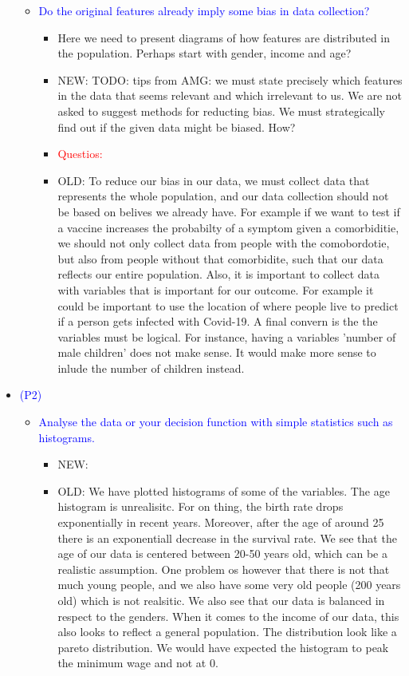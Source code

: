 \begin{itemize}
\begin{itemize}
\begin{itemize}
            \end{itemize}
            \item \textcolor{blue}{Do the original features already imply some bias in data collection?}
            \begin{itemize}
                \item Here we need to present diagrams of how features are distributed in the population. 
                Perhaps start with gender, income and age?
                \item NEW: TODO: tips from AMG: we must state precisely which features in the data that seems relevant and which irrelevant to us. 
                We are not asked to suggest methods for reducting bias. 
                We must strategically find out if the given data might be biased. How?
                \item \textcolor{red}{Questios:}
                \item OLD: To reduce our bias in our data, we must collect data that represents the whole population, and our data collection should not be based on belives we already have. For example if we want to test if a vaccine increases the probabilty of a symptom given a comorbiditie, we should not only collect data from people with the comobordotie, but also from people without that comorbidite, such that our data reflects our entire population. Also, it is important to collect data with variables that is important for our outcome. For example it could be important to use the location of where people live to predict if a person gets infected with Covid-19. A final convern is the the variables must be logical. For instance, having a variables 'number of male children' does not make sense. It would make more sense to inlude the number of children instead. 
            \end{itemize}
        \end{itemize}
    \item \textcolor{blue}{(P2)}
        \begin{itemize}
            \item \textcolor{blue}{Analyse the data or your decision function with simple statistics such as histograms.}
            \begin{itemize}
                \item NEW: 
                \item OLD: We have plotted histograms of some of the variables.
                The age histogram is unrealisitc. For on thing, the birth rate drops exponentially in recent years. Moreover, after the age of around 25 there is an exponentiall decrease in the survival rate. We see that the age of our data is centered between 20-50 years old, which can be a realistic assumption. One problem os however that there is not that much young people, and we also have some very old people (200 years old) which is not realsitic. We also see that our data is balanced in respect to the genders. When it comes to the income of our data, this also looks to reflect a general population. The distribution look like a pareto distribution. We would have expected the histogram to peak the minimum wage and not at 0. 

\end{itemize}
\end{itemize}
\end{itemize}

